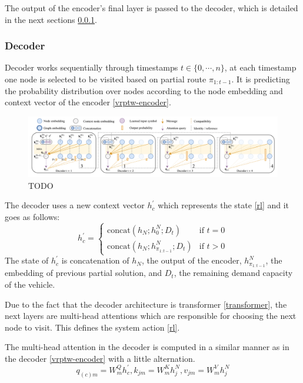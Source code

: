     The output of the encoder's final layer is passed to the decoder, which is detailed in the next sections \ref{vrptw-decoder}.
    
    \subsubsection{Decoder}\label{vrptw-decoder}
    Decoder works sequentially through timestamps $t \in \{0, \cdots, n\}$, at each timestamp one node is selected to be visited based on partial route $\pi_{1:t-1}$. It is predicting the probability distribution over nodes according to the node embedding and context vector of the encoder \ref{vrptw-encoder}.
    
    \begin{figure}[ht]
        \centering
        \includegraphics[width=1.0\textwidth]{resources/vrptw-ai/decoder-diagram.png}
        \caption{TODO \cite{attention-route}}
        \label{fig:encoder-diagram}
    \end{figure}
    
    The decoder uses a new context vector $h_{c}^{'}$ which represents the state \ref{rl} and it goes as follows:
    \begin{equation}\label{decode-state-vec}
        h_{c}^{'} = \begin{cases} \text{concat}(h_N; h_0^N; D_t) & \mbox{if } t = 0 \\ \text{concat}(h_N; h_{\pi_{1:t-1}}^N; D_t) & \mbox{if } t > 0 \end{cases}
    \end{equation}
    The state of $h_{c}^{'}$ is concatenation of $h_N$, the output of the encoder, $h_{\pi_{1:t-1}}^N$, the embedding of previous partial solution, and $D_t$, the remaining demand capacity of the vehicle.
    
    Due to the fact that the decoder architecture is transformer \ref{transformer}, the next layers are multi-head attentions which are responsible for choosing the next node to visit. This defines the system action \ref{rl}.
    
    The multi-head attention in the decoder is computed in a similar manner as in the decoder \ref{vrptw-encoder} with a little alternation.
    \begin{equation}
        q_{(c)m} = W_m^Q h_{c}^{'}, k_{jm} = W_m^K h_{j}^{N}, v_{jm} = W_m^V h_{j}^{N}
    \end{equation}
    
